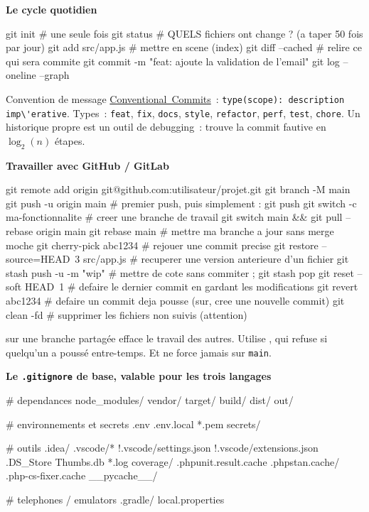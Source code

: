 \documentclass[12pt,a4paper,twoside,openright]{book}
\newcommand{\fichier}[1]{\texttt{\color{pathgreen}#1}}
\providecommand{\cmd}[1]{}%
\renewcommand{\cmd}[1]{\srcbox{\texttt{\detokenize{#1}}}}
\newcommand{\link}[2]{\href{#2}{#1}}
\newcommand{\etape}[1]{\par\medskip\noindent\textbf{\large #1}\par\smallskip}
\begin{document}
\etape{Le cycle quotidien}
\begin{terminal}
git init                     # une seule fois
git status                   # QUELS fichiers ont change ? (a taper 50 fois par jour)
git add src/app.js           # mettre en scene (index)
git diff --cached            # relire ce qui sera commite
git commit -m "feat: ajoute la validation de l'email"
git log --oneline --graph
\end{terminal}

Convention de message \link{Conventional~Commits}{https://www.conventionalcommits.org/fr/v1.0.0/}~:
\verb|type(scope): description imp\'erative|. Types~: \verb|feat|, \verb|fix|, \verb|docs|,
\verb|style|, \verb|refactor|, \verb|perf|, \verb|test|, \verb|chore|. Un historique propre est
un outil de debugging~: \cmd{git bisect} trouve la commit fautive en $\log_2(n)$ \'etapes.

\etape{Travailler avec GitHub / GitLab}
\begin{terminal}
git remote add origin git@github.com:utilisateur/projet.git
git branch -M main
git push -u origin main          # premier push, puis simplement : git push
git switch -c ma-fonctionnalite  # creer une branche de travail
git switch main && git pull --rebase origin main
git rebase main                  # mettre ma branche a jour sans merge moche
git cherry-pick abc1234          # rejouer une commit precise
git restore --source=HEAD~3 src/app.js   # recuperer une version anterieure d'un fichier
git stash push -u -m "wip"       # mettre de cote sans commiter ; git stash pop
git reset --soft HEAD~1          # defaire le dernier commit en gardant les modifications
git revert abc1234               # defaire un commit deja pousse (sur, cree une nouvelle commit)
git clean -fd                    # supprimer les fichiers non suivis (attention)
\end{terminal}

\begin{piege}
\cmd{git push --force} sur une branche partag\'ee efface le travail des autres. Utilise
\cmd{--force-with-lease}, qui refuse si quelqu'un a pouss\'e entre-temps. Et ne force
jamais sur \verb|main|.
\end{piege}

\etape{Le \fichier{.gitignore} de base, valable pour les trois langages}
\begin{codeconf}
# dependances
node_modules/
vendor/
target/
build/
dist/
out/

# environnements et secrets
.env
.env.local
*.pem
secrets/

# outils
.idea/
.vscode/*
!.vscode/settings.json
!.vscode/extensions.json
.DS_Store
Thumbs.db
*.log
coverage/
.phpunit.result.cache
.phpstan.cache/
.php-cs-fixer.cache
__pycache__/

# telephones / emulators
.gradle/
local.properties
\end{codeconf}
\end{document}
